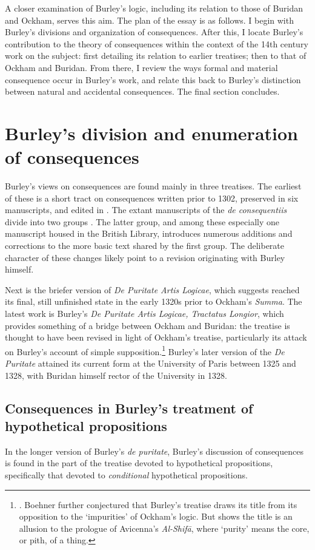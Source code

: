 \documentclass[]{article}
\begin{document}
A closer examination of Burley's logic, including its relation to those of Buridan and Ockham, serves this aim. The plan of the essay is as follows. I begin with Burley's divisions and organization of consequences. After this, I locate Burley's contribution to the theory of consequences within the context of the 14th century work on the subject: first detailing its relation to earlier treatises; then to that of Ockham and Buridan. From there, I review the ways formal and material consequence occur in Burley's work, and relate this back to Burley's distinction between natural and accidental consequences. The final section concludes.
\section{Burley's division and enumeration of consequences}
Burley's views on consequences are found mainly in three treatises. The earliest of these is a short tract on consequences written prior to 1302, preserved in six manuscripts, and edited in \cite{Green-Pedersen1980b}. The extant manuscripts of the \textit{de consequentiis} divide into two groups \cite[pp. 104-105]{Green-Pedersen1980b}. The latter group, and among these especially one manuscript housed in the British Library, introduces numerous additions and corrections to the more basic text shared by the first group. The deliberate character of these changes likely point to a revision originating with Burley himself.

Next is the briefer version of \textit{De Puritate Artis Logicae}, which \cite{Boehner1955} suggests reached its final, still unfinished state in the early 1320s prior to Ockham's \textit{Summa}. The latest work is Burley's \textit{De Puritate Artis Logicae, Tractatus Longior}, which provides something of a bridge between Ockham and Buridan: the treatise is thought to have been revised in light of Ockham's treatise, particularly its attack on Burley's account of simple supposition.\footnote{\cite{Boehner1955}. Boehner further conjectured that Burley's treatise draws its title from its opposition to the `impurities' of Ockham's logic. But \cite{SpadeMenn} shows the title is an allusion to the prologue of Avicenna's \textit{Al-Shif\={a}}, where `purity' means the core, or pith, of a thing.} Burley's later version of the \textit{De Puritate} attained its current form at the University of Paris between 1325 and 1328, with Buridan himself rector of the University in 1328.
\subsection{Consequences in Burley's treatment of hypothetical propositions}
In the longer version of Burley's \textit{de puritate}, Burley's discussion of consequences is found in the part of the treatise devoted to hypothetical propositions, specifically that devoted to \textit{conditional} hypothetical propositions. 
\end{document}
